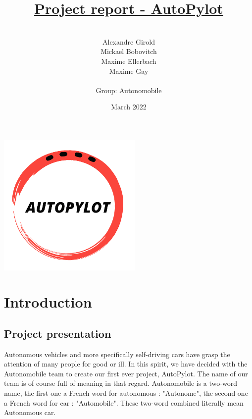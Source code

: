 \documentclass[12pt]{article}
\begin{document}
\title{\underline{Project report - AutoPylot}}
\date{March 2022}


\author{%
    \\
    Alexandre Girold\\
    Mickael Bobovitch \\
    Maxime Ellerbach \\
    Maxime Gay \\ \\
    Group: Autonomobile 
    }

\maketitle

\centerline{\includegraphics[height=7cm]{../../logos/logo-transparent-black.png}}
\newpage

\tableofcontents
\newpage

\section{Introduction}

\subsection{Project presentation}
Autonomous vehicles and more specifically self-driving cars have grasp the attention of many people for good or ill. In this spirit, we have decided with the Autonomobile team to create our first ever project, AutoPylot. The name of our team is of course full of meaning in that regard. Autonomobile is a two-word name, the first one a French word for autonomous : "Autonome", the second one a French word for car : "Automobile". These two-word combined literally mean Autonomous car.\\
\end{document}
